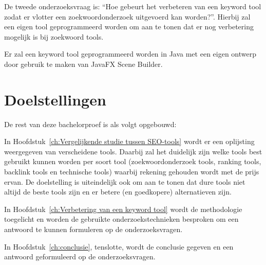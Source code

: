 De tweede onderzoeksvraag is: “Hoe gebeurt het verbeteren van een keyword tool zodat er vlotter een zoekwoordonderzoek uitgevoerd kan worden?”. Hierbij zal een eigen tool geprogrammeerd worden om aan te tonen dat er nog verbetering mogelijk is bij zoekwoord tools. 

Er zal een keyword tool geprogrammeerd worden in Java met een eigen ontwerp door gebruik te maken van JavaFX Scene Builder. 


\section{Doelstellingen}
\label{sec:doelstellingen}


De rest van deze bachelorproef is als volgt opgebouwd:

In Hoofdstuk~\ref{ch:Vergelijkende studie tussen SEO-tools} wordt er een oplijsting  weergegeven van verscheidene tools. Daarbij zal het duidelijk zijn welke tools best gebruikt kunnen worden per soort tool (zoekwoordonderzoek tools, ranking tools, backlink tools en technische tools) waarbij rekening gehouden wordt met de prijs ervan. De doelstelling is uiteindelijk ook om aan te tonen dat dure tools niet altijd de beste tools zijn en er betere (en goedkopere) alternatieven zijn. 

In Hoofdstuk~\ref{ch:Verbetering van een keyword tool} wordt de methodologie toegelicht en worden de gebruikte onderzoekstechnieken besproken om een antwoord te kunnen formuleren op de onderzoeksvragen.


In Hoofdstuk~\ref{ch:conclusie}, tenslotte, wordt de conclusie gegeven en een antwoord geformuleerd op de onderzoeksvragen. 

